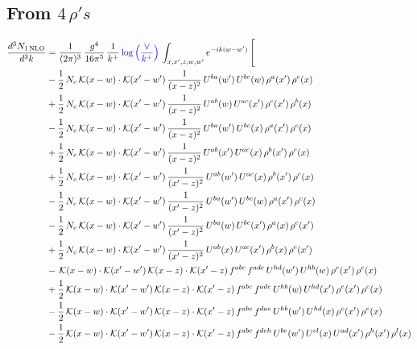 \documentclass[9pt]{article}
\numberwithin{equation}{section}
\begin{document}
\subsection{From $4\, \rho's$}
\begin{align}
\frac{d^{3}N_{1\,\mathrm{NLO}}}{d^{3}k} & = \frac{1}{(2\pi)^{3}}\,\frac{g^{4}}{16\pi^{5}}\,\frac{1}{k^{+}}\,{\color{blue}\log{\left(\frac{\vee}{k^{+}}\right)}}\,\int_{x,x',z,w,w'}e^{-ik(w-w')}\,\Bigg[\notag\\ & -\frac{1}{2}\,N_{c}\,\mathcal{K}(x-w)\cdot\mathcal{K}(x'-w')\,\frac{1}{(x-z)^{2}}\,U^{ba}(w')\,U^{bc}(w)\,\rho^{a}(x')\,\rho^{c}(x)\notag\\
& +\frac{1}{2}\,N_{c}\,\mathcal{K}(x-w)\cdot\mathcal{K}(x'-w')\,\frac{1}{(x-z)^{2}}\,U^{ab}(w)\,U^{ac}(x')\,\rho^{c}(x')\,\rho^{b}(x)\notag\\
& -\frac{1}{2}\,N_{c}\,\mathcal{K}(x-w)\cdot\mathcal{K}(x'-w')\,\frac{1}{(x-z)^{2}}\,U^{ba}(w')\,U^{bc}(x)\,\rho^{a}(x')\,\rho^{c}(x)\notag\\
& +\frac{1}{2}\,N_{c}\,\mathcal{K}(x-w)\cdot\mathcal{K}(x'-w')\,\frac{1}{(x-z)^{2}}\,U^{ab}(x')\,U^{ac}(x)\,\rho^{b}(x')\,\rho^{c}(x)\notag\\
& +\frac{1}{2}\,N_{c}\,\mathcal{K}(x-w)\cdot\mathcal{K}(x'-w')\,\frac{1}{(x'-z)^{2}}\,U^{ab}(w')\,U^{ac}(x)\,\rho^{b}(x')\,\rho^{c}(x)\notag\\
& -\frac{1}{2}\,N_{c}\,\mathcal{K}(x-w)\cdot\mathcal{K}(x'-w')\,\frac{1}{(x'-z)^{2}}\,U^{ba}(w')\,U^{bc}(w)\,\rho^{a}(x')\,\rho^{c}(x)\notag\\
& -\frac{1}{2}\,N_{c}\,\mathcal{K}(x-w)\cdot\mathcal{K}(x'-w')\,\frac{1}{(x'-z)^{2}}\,U^{ba}(w)\,U^{bc}(x')\,\rho^{a}(x)\,\rho^{c}(x')\notag\\
& +\frac{1}{2}\,N_{c}\,\mathcal{K}(x-w)\cdot\mathcal{K}(x'-w')\,\frac{1}{(x'-z)^{2}}\,U^{ab}(x)\,U^{ac}(x')\,\rho^{b}(x)\,\rho^{c}(x')\notag\\
& -\,\mathcal{K}(x-w)\cdot\mathcal{K}(x'-w')\,\mathcal{K}(x-z)\cdot\mathcal{K}(x'-z)\,f^{abc}\,f^{ade}\,U^{hd}(w')\,U^{hb}(w)\,\rho^{e}(x')\,\rho^{c}(x)\notag\\
& +\frac{1}{2}\,\mathcal{K}(x-w)\cdot\mathcal{K}(x'-w')\,\mathcal{K}(x-z)\cdot\mathcal{K}(x'-z)\,f^{abc}\,f^{ade}\,U^{hb}(w)\,U^{hd}(x')\,\rho^{e}(x')\,\rho^{c}(x)\notag\\
& -\frac{1}{2}\,\mathcal{K}(x-w)\cdot\mathcal{K}(x'-w')\,\mathcal{K}(x-z)\cdot\mathcal{K}(x'-z)\,f^{abc}\,f^{dae}\,U^{hb}(w')\,U^{hd}(x)\,\rho^{c}(x')\,\rho^{e}(x)\notag\\
& -\frac{1}{2}\,\mathcal{K}(x-w)\cdot\mathcal{K}(x'-w')\,\mathcal{K}(x-z)\cdot\mathcal{K}(x'-z)\,f^{abc}\,f^{deh}\,U^{be}(w')\,U^{cl}(x)\,U^{ad}(x')\,\rho^{h}(x')\,\rho^{l}(x)\notag\\

\end{align}
\end{document}
